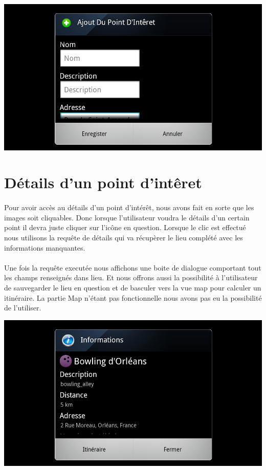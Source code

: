 \begin{onehalfspace}
    \begin{center}
	\includegraphics[width=140mm]{images/ajout_poi.png}
    \end{center}

      
    \section*{Détails d'un point d'intêret}
    
    \paragraph{}
    Pour avoir accès au détails d'un point d'intérêt, nous avons fait en sorte que les images soit cliquables. Donc lorsque l'utilisateur voudra le
    détails d'un certain point il devra juste cliquer sur l'icône en question. Lorsque le clic est effectué nous utilisons la requête de détails qui 
    va récupèrer le lieu complété avec les informations manquantes.
    
    \paragraph{}
    Une fois la requête executée nous affichons une boite de dialogue comportant tout les champs renseignés dans lieu. Et nous offrons aussi la possibilité
    à l'utilisateur de sauvegarder le lieu en question et de basculer vers la vue map pour calculer un itinéraire. La partie Map n'étant pas fonctionnelle
    nous avons pas eu la possibilité de l'utiliser.
    
    \begin{center}
	\includegraphics[width=140mm]{images/detail_poi.png}
    \end{center}
    

\end{onehalfspace}
